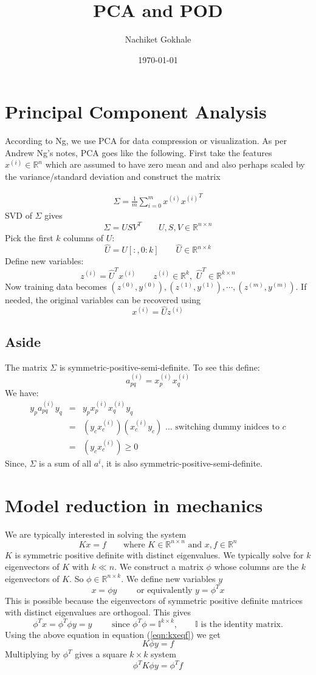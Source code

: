 \documentclass{article}
\newcommand{\beq}{\begin{equation}}
\newcommand{\eeq}{\end{equation}}
\newcommand{\ber}{\begin{eqnarray}}
\newcommand{\eer}{\end{eqnarray}}
\begin{document}
\title{PCA and POD}
\author{Nachiket Gokhale}
\date{\today}
\maketitle
\section{Principal Component Analysis}
According to Ng, we use PCA for data compression or visualization. As per Andrew Ng's notes, PCA goes like the following. First take the features $x^{(i)} \in \mathbb{R}^n$ which are assumed to have zero mean and and also perhaps scaled by the variance/standard deviation and construct the matrix

\ber
\label{eqn:discretexxt}
\Sigma = \frac{1}{m}\sum_{i=0}^{m}x^{(i)}{x^{(i)}}^{T}
\eer
%
SVD of $\Sigma$ gives
\beq
\Sigma = USV^{T} \qquad U,S,V \in \mathbb{R}^{n\times{n}}
\eeq
Pick the first $k$ columns of $U$:
\beq
\hat{U} = U[:,0:k]  \qquad \hat{U} \in \mathbb{R}^{n\times{k}}
\eeq
Define new variables:
\beq
z^{(i)}   = {\hat{U}}^{T}x^{(i)} \qquad z^{(i)} \in \mathbb{R}^{k},\,\, {\hat{U}}^{T} \in \mathbb{R}^{k\times{n}}
\eeq
Now training data becomes $(z^{(0)},y^{(0)}), (z^{(1)},y^{(1)}), \cdots, (z^{(m)},y^{(m)})$. If needed, the original variables can be recovered using
\beq
x^{(i)} = \hat{U}z^{(i)}
\eeq

%
%
\subsection{Aside} 
The matrix $\Sigma$ is symmetric-positive-semi-definite. To see this define:
\beq
a_{pq}^{(i)} = x^{(i)}_{p}{x^{(i)}_{q}}
\eeq
We have:
\ber
y_{p}a_{pq}^{(i)}y_{q} &=& y_{p}x^{(i)}_{p}{x^{(i)}_{q}}y_{q}  \\
&=& (y_{c}x^{(i)}_{c})({x^{(i)}_{c}}y_{c}) \text{ ... switching dummy inidces to }c\\
&=& (y_{c}x^{(i)}_{c}) \ge 0
\eer
Since, $\Sigma$ is a sum of all $a^{i}$, it is also symmetric-positive-semi-definite.
\section{Model reduction in mechanics}
We are typically interested in solving the system
\beq
\label{eqn:kxeqf}
Kx = f \qquad \text{where } K\in\mathbb{R}^{n\times{n}} \text{ and } x,f \in \mathbb{R}^n
\eeq
$K$ is symmetric positive definite with distinct eigenvalues. We typically solve for $k$ eigenvectors of $K$ with $k \ll n$. We construct a matrix $\phi$ whose columns are the $k$ eigenvectors of $K$. So $\phi \in \mathbb{R}^{n\times{k}}$. We define new variables $y$
\beq
x = \phi{y} \qquad \text{ or equivalently } y = \phi^Tx
\eeq
This is possible because the eigenvectors of symmetric positive definite matrices with distinct eigenvalues are orthogoal. This gives
\beq
\phi^Tx = \phi^T\phi y = y \qquad \text{ since } \phi^T\phi = \mathbb{I}^{k\times{k}}, \qquad \mathbb{I} \text{ is the identity matrix.}
\eeq
Using the above equation in equation (\ref{eqn:kxeqf}) we get
\beq
K\phi{y} = f
\eeq
Multiplying by $\phi^T$ gives a square $k\times{k}$ system
\beq
\phi^TK\phi{y} = \phi^Tf
\eeq
\end{document}
